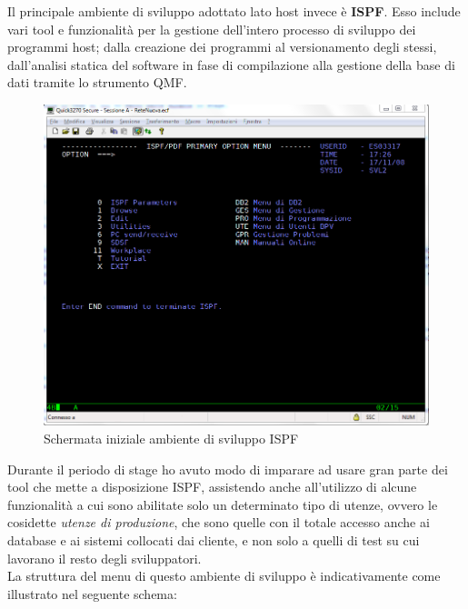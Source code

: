 	Il principale ambiente di sviluppo adottato lato host invece è \textbf{ISPF}\glossario. Esso include vari tool e funzionalità per la gestione dell'intero processo di sviluppo dei programmi host; dalla creazione dei programmi al versionamento degli stessi, dall'analisi statica del software in fase di compilazione alla gestione della base di dati tramite lo strumento QMF\glossario.

	\begin{figure}[H]
		\centering
	   	\includegraphics[width=1\textwidth]{immagini/ISPF}
	   	\caption{Schermata iniziale ambiente di sviluppo ISPF}
	\end{figure}

	Durante il periodo di stage ho avuto modo di imparare ad usare gran parte dei tool che mette a disposizione ISPF, assistendo anche all'utilizzo di alcune funzionalità a cui sono abilitate solo un determinato tipo di utenze, ovvero le cosidette \textit{utenze di produzione}, che sono quelle con il totale accesso anche ai database e ai sistemi collocati dai cliente, e non solo a quelli di test su cui lavorano il resto degli sviluppatori.\\
	
	La struttura del menu di questo ambiente di sviluppo è indicativamente come illustrato nel seguente schema:
	
